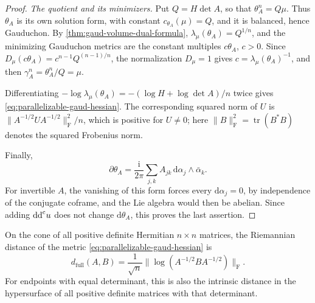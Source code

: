 \begin{proof}
\emph{The quotient and its minimizers.}
Put $Q=H\det A$, so that $\theta_A^n=Q\mu$. Thus $\theta_A$ is its own solution form, with constant $c_{\theta_A}(\mu)=Q$, and it is balanced, hence Gauduchon. By \cref{thm:gaud-volume-dual-formula}, $\lambda_\mu(\theta_A)=Q^{1/n}$, and the minimizing Gauduchon metrics are the constant multiples $c\theta_A$, $c>0$. Since $D_\mu(c\theta_A)=c^{n-1}Q^{(n-1)/n}$, the normalization $D_\mu=1$ gives $c=\lambda_\mu(\theta_A)^{-1}$, and then $\gamma_A^n=\theta_A^n/Q=\mu$.

Differentiating $-\log\lambda_\mu(\theta_A)=-(\log H+\log\det A)/n$ twice gives \eqref{eq:parallelizable-gaud-hessian}. The corresponding squared norm of $U$ is $\|A^{-1/2}UA^{-1/2}\|_{\mathrm F}^2/n$, which is positive for $U\ne0$; here $\|B\|_{\mathrm F}^2=\operatorname{tr}(B^*B)$ denotes the squared Frobenius norm.

Finally,
\[
 \partial\theta_A=\frac{\mathrm i}{2\pi}\sum_{j,k}A_{jk}\,\mathrm d\alpha_j\wedge\bar\alpha_k.
\]
For invertible $A$, the vanishing of this form forces every $\mathrm d\alpha_j=0$, by independence of the conjugate coframe, and the Lie algebra would then be abelian. Since adding $\mathrm{dd}^{\mathrm{c}} u$ does not change $\mathrm d\theta_A$, this proves the last assertion.
\end{proof}

\begin{lemma}\label{lem:positive-matrix-hessian-distance}
On the cone of all positive definite Hermitian $n\times n$ matrices, the Riemannian distance of the metric \eqref{eq:parallelizable-gaud-hessian} is
\begin{equation}\label{eq:positive-matrix-hessian-distance}
 d_{\mathrm{full}}(A,B)=\frac1{\sqrt n}
       \|\log(A^{-1/2}BA^{-1/2})\|_{\mathrm F}.
\end{equation}
For endpoints with equal determinant, this is also the intrinsic distance in the hypersurface of all positive definite matrices with that determinant.
\end{lemma}

